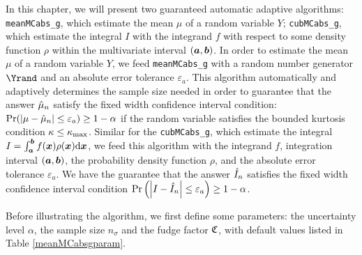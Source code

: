 \documentclass{iitthesis}
\theoremstyle{definition}
\begin{document}
In this chapter, we will present two guaranteed automatic adaptive algorithms: {\tt meanMCabs\_g}, which estimate the mean $\mu$ of a random variable $Y$; {\tt cubMCabs\_g}, which estimate the integral $I$ with the integrand $f$ with respect to some density function $\rho$ within the multivariate interval $(\boldsymbol{a},\boldsymbol{b})$. In order to estimate the mean $\mu$ of a random variable $Y$, we feed {\tt meanMCabs\_g} with a random number generator $\Yrand$ and an absolute error tolerance $\varepsilon_a$. This algorithm automatically and adaptively determines the sample size needed in order to guarantee that the answer $\hat{\mu}_n$ satisfy the fixed width confidence interval condition: $\Pr (\left \lvert \mu-\hat{\mu}_n \right \rvert \leq \varepsilon_a) \geq 1-\alpha$ if the random variable satisfies the bounded kurtosis condition $\kappa \leq \kappa_{\max}$. Similar for the {\tt cubMCabs\_g}, which estimate the integral $I=\int_{\boldsymbol{a}}^{\boldsymbol{b}} f(\boldsymbol{x})\rho(\boldsymbol{x}){\rm d}\boldsymbol{x}$, we feed this algorithm with the integrand $f$, integration interval $(\boldsymbol{a},\boldsymbol{b})$, the probability density function $\rho$, and the absolute error tolerance $\varepsilon_a$. We have the guarantee that the answer $\hat{I}_n$ satisfies the fixed width confidence interval condition $\Pr \left(\left \lvert I-\hat{I}_n \right \rvert \leq \varepsilon_a\right) \geq 1-\alpha$.

 \label{sec:meanMCabsg}

Before illustrating the algorithm, we first define some parameters: the uncertainty level $\alpha$, the sample size $n_{\sigma}$ and the fudge factor $\mathfrak{C}$, with default values listed in Table \ref{meanMCabsgparam}.
\end{document}
